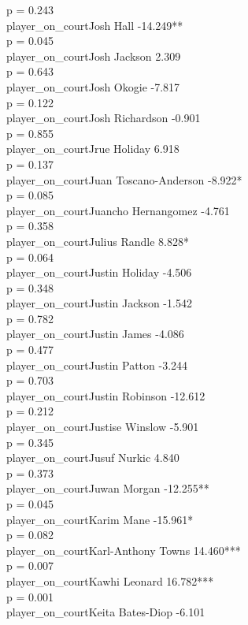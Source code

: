\documentclass[
  landscape]{article}
\begin{document}
p = 0.243\\
player\_on\_courtJosh Hall -14.249**\\
p = 0.045\\
player\_on\_courtJosh Jackson 2.309\\
p = 0.643\\
player\_on\_courtJosh Okogie -7.817\\
p = 0.122\\
player\_on\_courtJosh Richardson -0.901\\
p = 0.855\\
player\_on\_courtJrue Holiday 6.918\\
p = 0.137\\
player\_on\_courtJuan Toscano-Anderson -8.922*\\
p = 0.085\\
player\_on\_courtJuancho Hernangomez -4.761\\
p = 0.358\\
player\_on\_courtJulius Randle 8.828*\\
p = 0.064\\
player\_on\_courtJustin Holiday -4.506\\
p = 0.348\\
player\_on\_courtJustin Jackson -1.542\\
p = 0.782\\
player\_on\_courtJustin James -4.086\\
p = 0.477\\
player\_on\_courtJustin Patton -3.244\\
p = 0.703\\
player\_on\_courtJustin Robinson -12.612\\
p = 0.212\\
player\_on\_courtJustise Winslow -5.901\\
p = 0.345\\
player\_on\_courtJusuf Nurkic 4.840\\
p = 0.373\\
player\_on\_courtJuwan Morgan -12.255**\\
p = 0.045\\
player\_on\_courtKarim Mane -15.961*\\
p = 0.082\\
player\_on\_courtKarl-Anthony Towns 14.460***\\
p = 0.007\\
player\_on\_courtKawhi Leonard 16.782***\\
p = 0.001\\
player\_on\_courtKeita Bates-Diop -6.101\\
\end{document}
